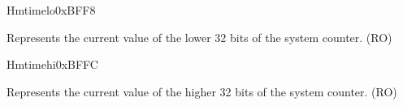 \begin{register}{H}{mtimelo}{0xBFF8}\label{regdesc:CLINTMTIMELOREG}
%
\regnewline%
\begin{regdesc}
\begin{reglist}
\label{fielddesc:CLINTMTIMELO}\item [MTIMELO] Represents the current value of the lower 32 bits of the system counter. (RO)
\end{reglist}
\end{regdesc}
\end{register}

\begin{register}{H}{mtimehi}{0xBFFC}\label{regdesc:CLINTMTIMEHIREG}
%
\regnewline%
\begin{regdesc}
\begin{reglist}
\label{fielddesc:CLINTMTIMEHI}\item [MTIMEHI] Represents the current value of the higher 32 bits of the system counter. (RO)
\end{reglist}
\end{regdesc}
\end{register}
